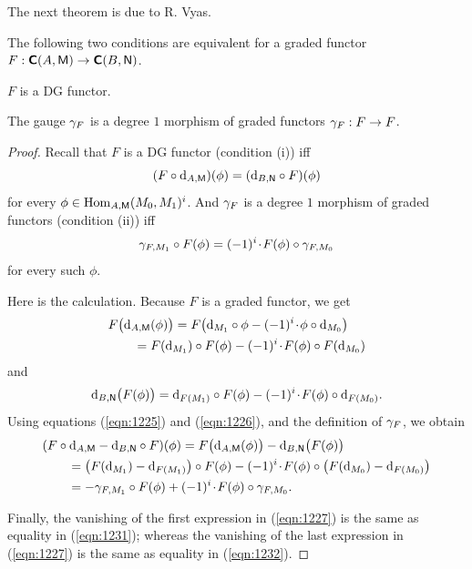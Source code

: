 The next theorem is due to R. Vyas. 

\begin{thm} \label{thm:1225}
The following two conditions are equivalent for a graded functor 
$F : \boldsymbol{\mathsf{C}}(A, \operatorname{\mathsf{M}}) \to \boldsymbol{\mathsf{C}}(B, \operatorname{\mathsf{N}})$.
\begin{enumerate}
 $F$ is a DG functor.
 
 The gauge $\gamma_F$ is a degree $1$ morphism of graded functors 
$\gamma_F : F \to F$.  
\end{enumerate}
\end{thm}

\begin{proof}
Recall that $F$ is a DG functor (condition (i)) iff 
\begin{equation}  \label{eqn:1231}
(F \circ \mathrm{d}_{A, \operatorname{\mathsf{M}}})(\phi) = (\mathrm{d}_{B, \operatorname{\mathsf{N}}} \circ F)(\phi)
\end{equation}
for every 
$\phi \in \operatorname{Hom}_{A, \operatorname{\mathsf{M}}}(M_{0}, M_{1})^{i}$.
And $\gamma_F$ is a degree $1$ morphism of graded functors  (condition (ii))
iff 
\begin{equation}  \label{eqn:1232}
\gamma_{F, M_1} \circ  F(\phi) = (-1)^i \mspace{1.5mu}{\cdot}\mspace{1.5mu} F(\phi) \circ \gamma_{F, M_0} 
\end{equation}
for every such $\phi$. 

Here is the calculation. 
Because $F$ is a graded functor, we get
\begin{equation}  \label{eqn:1225}
\begin{aligned}
& F \bigl( \mathrm{d}_{A, \operatorname{\mathsf{M}}}(\phi) \bigr) = 
F \bigl( \mathrm{d}_{M_1} \circ \phi - (-1)^i \mspace{1.5mu}{\cdot}\mspace{1.5mu} \phi \circ \mathrm{d}_{M_0} \bigr) 
\\
& \qquad = F(\mathrm{d}_{M_1}) \circ F(\phi) - (-1)^i \mspace{1.5mu}{\cdot}\mspace{1.5mu} F(\phi) \circ F(\mathrm{d}_{M_0})
\end{aligned} 
\end{equation}
and 
\begin{equation}  \label{eqn:1226}
\mathrm{d}_{B, \operatorname{\mathsf{N}}} \bigl( F(\phi)  \bigr) = 
\mathrm{d}_{F(M_1)} \circ F(\phi) - (-1)^i \mspace{1.5mu}{\cdot}\mspace{1.5mu} F(\phi) \circ \mathrm{d}_{F(M_0)} .
\end{equation}
Using equations  (\ref{eqn:1225}) and (\ref{eqn:1226}),
and the definition of $\gamma_F$, we obtain 
\begin{equation}  \label{eqn:1227}
\begin{aligned}
& (F \circ \mathrm{d}_{A, \operatorname{\mathsf{M}}} - \mathrm{d}_{B, \operatorname{\mathsf{N}}} \circ F)(\phi) = 
F \bigl( \mathrm{d}_{A, \operatorname{\mathsf{M}}}(\phi) \bigr) - \mathrm{d}_{B, \operatorname{\mathsf{N}}} \bigl( F(\phi)  \bigr)
\\
& \qquad = \bigl( F(\mathrm{d}_{M_1}) - \mathrm{d}_{F(M_1)} \bigr) \circ F(\phi) 
- (-1)^i \mspace{1.5mu}{\cdot}\mspace{1.5mu} F(\phi) \circ \bigl( F(\mathrm{d}_{M_0}) - \mathrm{d}_{F(M_0)} \bigr)
\\
& \qquad = - \gamma_{F, M_1} \circ  F(\phi) 
+ (-1)^i \mspace{1.5mu}{\cdot}\mspace{1.5mu} F(\phi) \circ \gamma_{F, M_0} . 
\end{aligned} 
\end{equation}

Finally, the vanishing of the first expression in (\ref{eqn:1227}) 
is the same as equality in (\ref{eqn:1231});  whereas the vanishing of the last 
expression in (\ref{eqn:1227}) is the same as equality in (\ref{eqn:1232}).
\end{proof}





